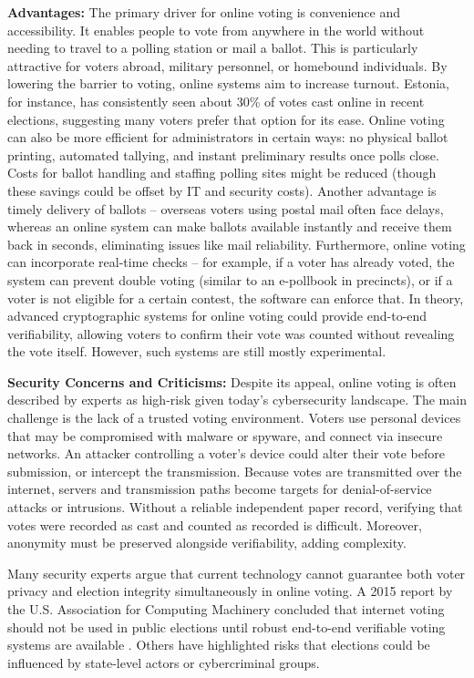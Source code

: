 \documentclass[a4paper,10pt]{report}
\begin{document}
\textbf {Advantages:} The primary driver for online voting is convenience and accessibility. It enables people to vote from anywhere in the world without needing to travel to a polling station or mail a ballot. This is particularly attractive for voters abroad, military personnel, or homebound individuals. By lowering the barrier to voting, online systems aim to increase turnout. Estonia, for instance, has consistently seen about 30\% of votes cast online in recent elections, suggesting many voters prefer that option for its ease. Online voting can also be more efficient for administrators in certain ways: no physical ballot printing, automated tallying, and instant preliminary results once polls close. Costs for ballot handling and staffing polling sites might be reduced (though these savings could be offset by IT and security costs). Another advantage is timely delivery of ballots – overseas voters using postal mail often face delays, whereas an online system can make ballots available instantly and receive them back in seconds, eliminating issues like mail reliability. Furthermore, online voting can incorporate real-time checks – for example, if a voter has already voted, the system can prevent double voting (similar to an e-pollbook in precincts), or if a voter is not eligible for a certain contest, the software can enforce that. In theory, advanced cryptographic systems for online voting could provide end-to-end verifiability, allowing voters to confirm their vote was counted without revealing the vote itself. However, such systems are still mostly experimental.

\textbf {Security Concerns and Criticisms:} Despite its appeal, online voting is often described by experts as high-risk given today’s cybersecurity landscape. The main challenge is the lack of a trusted voting environment. Voters use personal devices that may be compromised with malware or spyware, and connect via insecure networks. An attacker controlling a voter’s device could alter their vote before submission, or intercept the transmission. Because votes are transmitted over the internet, servers and transmission paths become targets for denial-of-service attacks or intrusions. Without a reliable independent paper record, verifying that votes were recorded as cast and counted as recorded is difficult. Moreover, anonymity must be preserved alongside verifiability, adding complexity.

Many security experts argue that current technology cannot guarantee both voter privacy and election integrity simultaneously in online voting. A 2015 report by the U.S. Association for Computing Machinery concluded that internet voting should not be used in public elections until robust end-to-end verifiable voting systems are available \cite{acm2015_report}. Others have highlighted risks that elections could be influenced by state-level actors or cybercriminal groups.
\end{document}
